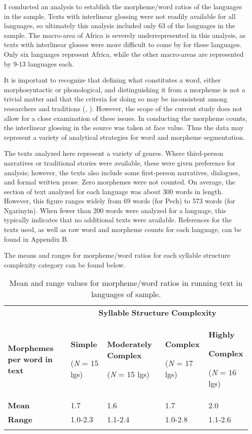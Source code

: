   I conducted an analysis to establish the morpheme/word ratios of the languages in the sample. Texts with interlinear glossing were not readily available for all languages, so ultimately this analysis included only 63 of the languages in the sample. The macro-area of Africa is severely underrepresented in this analysis, as texts with interlinear glosses were more difficult to come by for these languages. Only six languages represent Africa, while the other macro-areas are represented by 9-13 languages each.

  It is important to recognize that defining what constitutes a word, either morphosyntactic or phonological, and distinguishing it from a morpheme is not a trivial matter and that the criteria for doing so may be inconsistent among researchers and traditions (\citealt{Haspelmath2011}, \citealt{SchieringEtAl2010}). However, the scope of the current study does not allow for a close examination of these issues. In conducting the morpheme counts, the interlinear glossing in the source was taken at face value. Thus the data may represent a variety of analytical strategies for word and morpheme segmentation. 

  The texts analyzed here represent a variety of genres. Where third-person narratives or traditional stories were available, these were given preference for analysis; however, the texts also include some first-person narratives, dialogues, and formal written prose. Zero morphemes were not counted. On average, the section of text analyzed for each language was about 300 words in length. However, this figure ranges widely from 69 words (for Pech) to 573 words (for Ngarinyin). When fewer than 200 words were analyzed for a language, this typically indicates that no additional texts were available. References for the texts used, as well as raw word and morpheme counts for each language, can be found in Appendix B.

  The means and ranges for morpheme/word ratios for each syllable structure complexity category can be found below.

\begin{table}
\begin{tabularx}{\textwidth}{XXXXX}
\lsptoprule
 & \multicolumn{4}{c}{ \textbf{Syllable} \textbf{Structure} \textbf{Complexity}}\\
 \textbf{Morphemes} \textbf{per} \textbf{word} \textbf{in} \textbf{text} & { \textbf{Simple}}

 (\textit{N} = 15 lgs) & { \textbf{Moderately} \textbf{Complex}}

 (\textit{N} = 15 lgs) & { \textbf{Complex}}

 (\textit{N} = 17 lgs) & { \textbf{Highly} }

{ \textbf{Complex}}

 (\textit{N} = 16 lgs)\\
 \textbf{Mean} & 1.7 & 1.6 & 1.7 & 2.0\\
 \textbf{Range} & 1.0-2.3 & 1.1-2.4 & 1.0-2.8 & 1.1-2.6\\
\lspbottomrule
\end{tabularx}
\caption{\label{8.1}Mean and range values for morpheme/word ratios in running text in languages of sample.}
\end{table}

